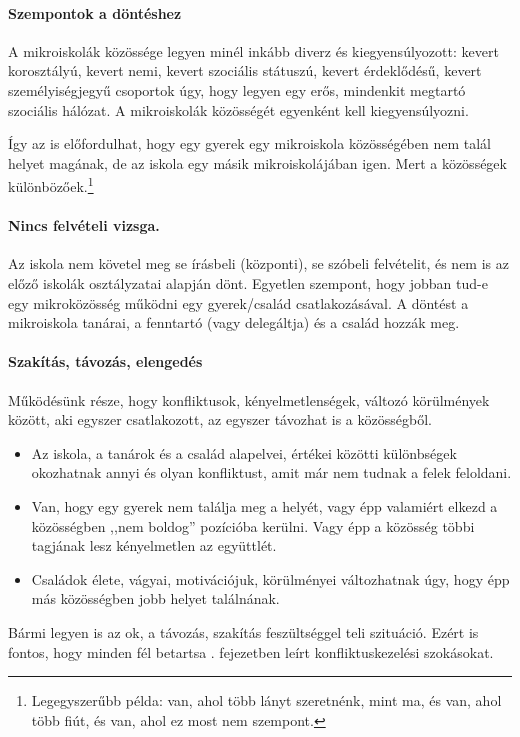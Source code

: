 \paragraph{Szempontok a döntéshez}
A mikroiskolák közössége legyen minél inkább diverz és kiegyensúlyozott: kevert
korosztályú, kevert nemi, kevert szociális státuszú, kevert
érdeklődésű, kevert személyiségjegyű csoportok úgy, hogy legyen egy erős,
mindenkit megtartó szociális
hálózat. A mikroiskolák közösségét egyenként kell kiegyensúlyozni.%

Így az is előfordulhat, hogy egy gyerek egy mikroiskola közösségében nem talál
helyet magának, de az iskola egy másik mikroiskolájában igen. Mert a
közösségek különbözőek.\footnote{Legegyszerűbb példa: van, ahol több lányt
      szeretnénk, mint ma, és van, ahol több fiút, és van, ahol ez most nem
      szempont.}

\paragraph{Nincs felvételi vizsga.}
Az iskola nem követel meg se írásbeli (központi), se szóbeli
felvételit, és nem is az előző iskolák osztályzatai alapján dönt. Egyetlen
szempont, hogy jobban tud-e egy mikroközösség működni egy gyerek/család
csatlakozásával. A döntést a mikroiskola tanárai, a fenntartó (vagy
delegáltja) és a család hozzák meg.


\paragraph{Szakítás, távozás, elengedés}
Működésünk része, hogy konfliktusok, kényelmetlenségek, változó körülmények
között, aki egyszer csatlakozott, az egyszer távozhat is a közösségből.
\begin{itemize}
      \item Az iskola, a tanárok és a család alapelvei, értékei közötti
            különbségek okozhatnak annyi és olyan konfliktust, amit már nem
            tudnak a felek
            feloldani.
      \item Van, hogy egy gyerek nem találja meg a helyét, vagy épp valamiért
            elkezd a közösségben ,,nem boldog'' pozícióba kerülni. Vagy épp a
            közösség
            többi tagjának lesz kényelmetlen az együttlét.
      \item Családok élete, vágyai, motivációjuk, körülményei
        változhatnak\linebreak
        úgy,
            hogy épp más közösségben jobb helyet találnának.
\end{itemize}

Bármi legyen is az ok, a távozás, szakítás feszültséggel teli szituáció. Ezért
is fontos, hogy minden fél betartsa  .
fejezetben leírt konfliktuskezelési szokásokat.
